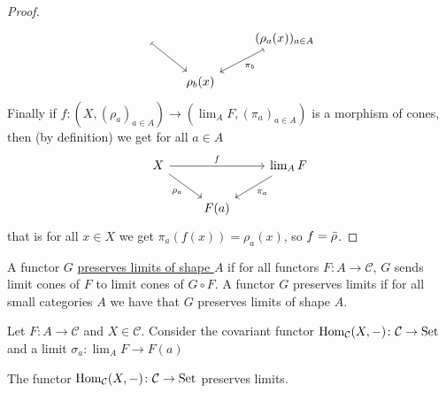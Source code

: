\begin{proof}
\[\begin{tikzcd}
        \arrow[rd , mapsto]
        &
        &
        (\rho_a(x))_{a \in A}
        \arrow[ld, mapsto , "\pi_b"]
        \\
        &
        \rho_b(x)
        &
    \end{tikzcd}
    \]
    Finally if $f\colon ( X , ( \rho_a )_{a \in A}) \to ( \lim_A F , (\pi_a)_{a \in A})$ is a morphism of cones, then (by definition) we get for all $a \in A$ 
    \[
    \begin{tikzcd}
        X
        \arrow[rr, "f"]
        \arrow[rd, "\rho_a"']
        &
        &
        \lim_A F
        \arrow[ld, "\pi_a"]
        \\
        &
        F(a)
        &
    \end{tikzcd}
    \]
    that is for all $x \in X$ we get $\pi_a(f(x)) = \rho_a(x)$, so $f= \Bar{\rho}$.
\end{proof}

\begin{defi}
    A functor $G$ \underline{preserves limits of shape $A$} if for all functors $F\colon A \to \mathcal{C}$, $G$ sends limit cones of $F$ to limit cones of $G \circ F$. 
    A functor $G$ preserves limits if for all small categories $A$ we have that $G$ preserves limits of shape $A$.
\end{defi}

\begin{rmk}
     Let $F \colon  A \to \mathcal{C}$ and $X\in \mathcal{C}$.
     Consider the covariant functor $\operatorname{Hom}_{\mathcal{C}}(X,-) \colon \mathcal{C} \to \operatorname{Set}$ and a limit $\sigma_a\colon \lim_A F \to F(a)$

\end{rmk}

\begin{thm}
    The functor $\operatorname{Hom}_{\mathcal{C}}(X,-) \colon \mathcal{C} \to \operatorname{Set}$ preserves limits.
\end{thm}

